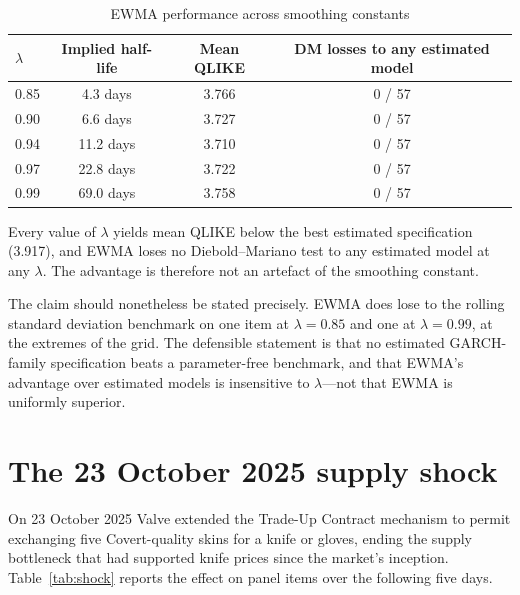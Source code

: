 \documentclass[11pt,a4paper]{article}
\begin{document}
\begin{table}[htbp]
\centering
\caption{EWMA performance across smoothing constants}
\label{tab:lambda}
\begin{tabular}{lccc}
\toprule
$\lambda$ & Implied half-life & Mean QLIKE & DM losses to any estimated model \\
\midrule
0.85 & 4.3 days  & 3.766 & 0 / 57 \\
0.90 & 6.6 days  & 3.727 & 0 / 57 \\
0.94 & 11.2 days & 3.710 & 0 / 57 \\
0.97 & 22.8 days & 3.722 & 0 / 57 \\
0.99 & 69.0 days & 3.758 & 0 / 57 \\
\bottomrule
\end{tabular}
\end{table}

Every value of $\lambda$ yields mean QLIKE below the best estimated
specification (3.917), and EWMA loses no Diebold--Mariano test to any estimated
model at any $\lambda$. The advantage is therefore not an artefact of the
smoothing constant.

The claim should nonetheless be stated precisely. EWMA does lose to the rolling
standard deviation benchmark on one item at $\lambda = 0.85$ and one at
$\lambda = 0.99$, at the extremes of the grid. The defensible statement is that
no estimated GARCH-family specification beats a parameter-free benchmark, and
that EWMA's advantage over estimated models is insensitive to $\lambda$---not
that EWMA is uniformly superior.

\section{The 23 October 2025 supply shock}\label{sec:shock}

On 23 October 2025 Valve extended the Trade-Up Contract mechanism to permit
exchanging five Covert-quality skins for a knife or gloves, ending the supply
bottleneck that had supported knife prices since the market's inception.
Table~\ref{tab:shock} reports the effect on panel items over the following
five days.
\end{document}
